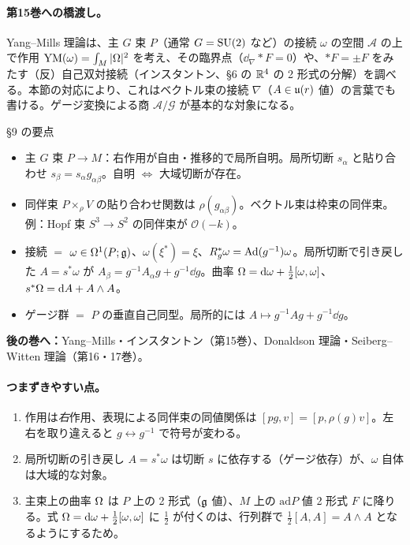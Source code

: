 \paragraph{第15巻への橋渡し。}Yang--Mills 理論は、主 $G$ 束 $P$（通常 $G=\mathrm{SU}(2)$ など）の接続 $\omega$ の空間 $\mathcal A$ の上で作用 $\mathrm{YM}(\omega)=\int_M|\Omega|^2$ を考え、その臨界点（$\dd_\nabla\ast F=0$）や、$\ast F=\pm F$ をみたす（反）自己双対接続（インスタントン、§6 の $\mathbb R^4$ の 2 形式の分解）を調べる。本節の対応により、これはベクトル束の接続 $\nabla$（$A\in\mathfrak{u}(r)$ 値）の言葉でも書ける。ゲージ変換による商 $\mathcal A/\mathcal G$ が基本的な対象になる。

\begin{keybox}{§9 の要点}
\begin{itemize}
\item 主 $G$ 束 $P\to M$：右作用が自由・推移的で局所自明。局所切断 $s_\alpha$ と貼り合わせ $s_\beta=s_\alpha g_{\alpha\beta}$。自明 $\Leftrightarrow$ 大域切断が存在。
\item 同伴束 $P\times_\rho V$ の貼り合わせ関数は $\rho(g_{\alpha\beta})$。ベクトル束は枠束の同伴束。例：Hopf 束 $S^3\to S^2$ の同伴束が $\mathcal O(-k)$。
\item 接続 $=$ $\omega\in\Omega^1(P;\mathfrak g)$、$\omega(\xi^*)=\xi$、$R_g^*\omega=\mathrm{Ad}(g^{-1})\omega$。局所切断で引き戻した $A=s^*\omega$ が $A_\beta=g^{-1}A_\alpha g+g^{-1}\dd g$。曲率 $\Omega=\mathrm{d}\omega+\frac12[\omega,\omega]$、$s^*\Omega=\mathrm{d} A+A\wedge A$。
\item ゲージ群 $=$ $P$ の垂直自己同型。局所的には $A\mapsto g^{-1}Ag+g^{-1}\dd g$。
\end{itemize}
\textbf{後の巻へ：}Yang--Mills・インスタントン（第15巻）、Donaldson 理論・Seiberg--Witten 理論（第16・17巻）。
\end{keybox}

\paragraph{つまずきやすい点。}
\begin{enumerate}
\item 作用は\emph{右}作用、表現による同伴束の同値関係は $[pg,v]=[p,\rho(g)v]$。左右を取り違えると $g\leftrightarrow g^{-1}$ で符号が変わる。
\item 局所切断の引き戻し $A=s^*\omega$ は切断 $s$ に依存する（ゲージ依存）が、$\omega$ 自体は大域的な対象。
\item 主束上の曲率 $\Omega$ は $P$ 上の 2 形式（$\mathfrak g$ 値）、$M$ 上の $\mathrm{ad}P$ 値 2 形式 $F$ に降りる。式 $\Omega=\mathrm{d}\omega+\frac12[\omega,\omega]$ に $\frac12$ が付くのは、行列群で $\frac12[A,A]=A\wedge A$ となるようにするため。
\end{enumerate}

